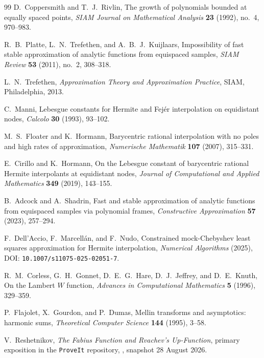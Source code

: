 \begin{thebibliography}{99}
D.~Coppersmith and T.~J.~Rivlin,
\newblock The growth of polynomials bounded at equally spaced
points,
\newblock \emph{SIAM Journal on Mathematical Analysis} \textbf{23}
(1992), no.~4, 970--983.

R.~B.~Platte, L.~N.~Trefethen, and A.~B.~J.~Kuijlaars,
\newblock Impossibility of fast stable approximation of analytic
functions from equispaced samples,
\newblock \emph{SIAM Review} \textbf{53} (2011), no.~2, 308--318.

L.~N.~Trefethen,
\newblock \emph{Approximation Theory and Approximation Practice},
\newblock SIAM, Philadelphia, 2013.

C.~Manni,
\newblock Lebesgue constants for Hermite and Fej\'er interpolation on
equidistant nodes,
\newblock \emph{Calcolo} \textbf{30} (1993), 93--102.

M.~S.~Floater and K.~Hormann,
\newblock Barycentric rational interpolation with no poles and high
rates of approximation,
\newblock \emph{Numerische Mathematik} \textbf{107} (2007),
315--331.

E.~Cirillo and K.~Hormann,
\newblock On the Lebesgue constant of barycentric rational Hermite
interpolants at equidistant nodes,
\newblock \emph{Journal of Computational and Applied Mathematics}
\textbf{349} (2019), 143--155.

B.~Adcock and A.~Shadrin,
\newblock Fast and stable approximation of analytic functions from
equispaced samples via polynomial frames,
\newblock \emph{Constructive Approximation} \textbf{57} (2023),
257--294.

F.~Dell'Accio, F.~Marcell\'an, and F.~Nudo,
\newblock Constrained mock-Chebyshev least squares approximation for
Hermite interpolation,
\newblock \emph{Numerical Algorithms} (2025),
DOI: \nolinkurl{10.1007/s11075-025-02051-7}.

R.~M.~Corless, G.~H.~Gonnet, D.~E.~G.~Hare, D.~J.~Jeffrey, and
D.~E.~Knuth,
\newblock On the Lambert $W$ function,
\newblock \emph{Advances in Computational Mathematics} \textbf{5}
(1996), 329--359.

P.~Flajolet, X.~Gourdon, and P.~Dumas,
\newblock Mellin transforms and asymptotics: harmonic sums,
\newblock \emph{Theoretical Computer Science} \textbf{144} (1995),
3--58.

V.~Reshetnikov,
\newblock \emph{The Fabius Function and Rvachev's Up-Function},
\newblock primary exposition in the \texttt{ProveIt} repository,
\repo, snapshot 28 August 2026.


\end{thebibliography}
